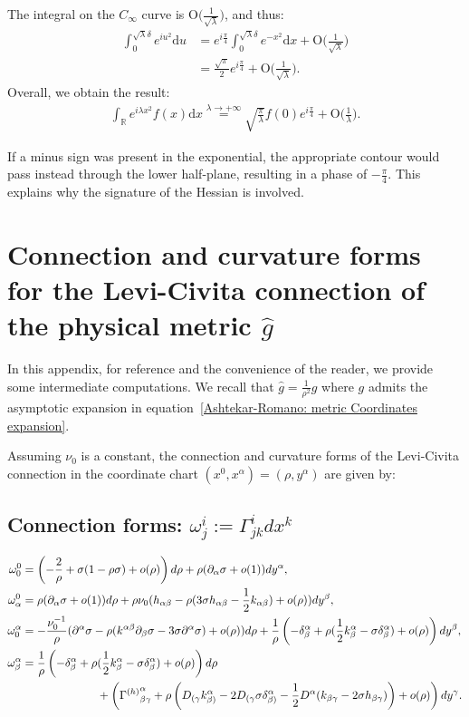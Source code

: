 \documentclass[a4paper, 10pt]{article}
\theoremstyle{remark}
\newcommand{\R}{\mathbb{R}}
\newcommand{\bigO}[1]{\textrm{O(}#1\textrm{)}}
\begin{document}
The integral on the $C_\infty$ curve is $\bigO{\frac{1}{\sqrt{\lambda}}}$, and thus:
%
\begin{align}
    \int_{0}^{\sqrt{\lambda}\delta} e^{iu^2}\textrm{d}u &= e^{i\frac{\pi}{4}}\int_0^{\sqrt{\lambda}\delta}e^{-x^2}\textrm{d}x +\bigO{\frac{1}{\sqrt{\lambda}}}\\&=\frac{\sqrt{\pi}}{2}e^{i\frac{\pi}{4}}+\bigO{\frac{1}{\sqrt{\lambda}}}.
\end{align}
Overall, we obtain the result: 
%
\begin{align}
    \int_\R e^{i\lambda x^2}f(x)\textrm{d} x \overset{\lambda \to + \infty}{=} \sqrt{\frac{\pi}{\lambda}}f(0)e^{i\frac{\pi}{4}} + \bigO{\frac{1}{\lambda}}.
\end{align}

If a minus sign was present in the exponential, the appropriate contour would pass instead through the lower half-plane, resulting in a phase of $- \frac{\pi}{4}$. This explains why the signature of the Hessian is involved.


\section{Connection and curvature forms for the Levi-Civita connection of the physical metric $\hat{g}$}
In this appendix, for reference and the convenience of the reader, we provide some intermediate computations. We recall that $\hat{g}=\frac{1}{\rho^2}g$ where $g$ admits the asymptotic expansion in equation~\eqref{Ashtekar-Romano: metric Coordinates expansion}. 

Assuming $\nu_0$ is a constant, the connection and curvature forms of the Levi-Civita connection in the coordinate chart $(x^0, x^\alpha)=(\rho, y^\alpha)$ are given by:
 \subsection*{Connection forms: $\omega^i_j := \Gamma^i_{jk}dx^k$}
 \begin{align}
 \omega^0_0&=\left(-\frac{2}{\rho} + \sigma(1-\rho\sigma) + o(\rho)\right)d \rho + \rho(\partial_\alpha \sigma + o(1))dy^\alpha, \\ 
 \omega^0_\alpha & = \rho(\partial_\alpha \sigma +o(1))d\rho  +\rho\nu_0(h_{\alpha \beta}- \rho(3\sigma h_{\alpha \beta} - \frac{1}{2}k_{\alpha \beta})+o(\rho))dy^\beta,\\
 \omega^\alpha_0 & =-\frac{\nu_0^{-1}}{\rho}(\partial^\alpha \sigma - \rho(k^{\alpha\beta}\partial_\beta\sigma-3\sigma\partial^\alpha\sigma)+o(\rho))d\rho+\frac{1}{\rho}\left(-\delta^\alpha_\beta +\rho(\frac{1}{2}k^\alpha_\beta - \sigma \delta^\alpha_\beta)+o(\rho) \right)dy^\beta,\\
 \omega^\alpha_\beta&=\frac{1}{\rho}\left(-\delta^\alpha_\beta +\rho(\frac{1}{2}k^\alpha_\beta-\sigma\delta^\alpha_\beta) +o(\rho)\right)d\rho \\&\hspace{2.3cm} +\left({\Gamma^{(h)}}^\alpha_{\beta\gamma}+\rho\left(D_{(\gamma}k^{\alpha}_{\beta)}-2D_{(\gamma}\sigma\delta^\alpha_{\beta)}-\frac{1}{2}D^\alpha(k_{\beta\gamma}-2\sigma h_{\beta\gamma})\right)+o(\rho)\right)dy^\gamma.
 \end{align}
\end{document}
